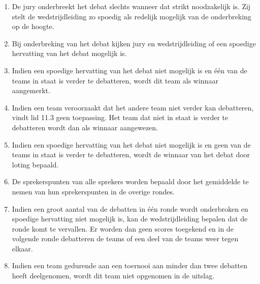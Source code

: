 
\begin{enumerate}
\item De jury onderbreekt het debat slechts wanneer dat strikt noodzakelijk is. Zij stelt de wedstrijdleiding zo spoedig als redelijk mogelijk van de onderbreking op de hoogte.
\item Bij onderbreking van het debat kijken jury en wedstrijdleiding of een spoedige hervatting van het debat mogelijk is.
\item Indien een spoedige hervatting van het debat niet mogelijk is en één van de teams in staat is verder te debatteren, wordt dit team als winnaar aangemerkt.
\item Indien een team veroorzaakt dat het andere team niet verder kan debatteren, vindt lid 11.3 geen toepassing. Het team dat niet in staat is verder te debatteren wordt dan als winnaar aangewezen.
\item Indien een spoedige hervatting van het debat niet mogelijk is en geen van de teams in staat is verder te debatteren, wordt de winnaar van het debat door loting bepaald. 
\item De sprekerspunten van alle sprekers worden bepaald door het gemiddelde te nemen van hun sprekerspunten in de overige rondes.
\item Indien een groot aantal van de debatten in één ronde wordt onderbroken en spoedige hervatting niet mogelijk is, kan de wedstrijdleiding bepalen dat de ronde komt te vervallen. Er worden dan geen scores toegekend en in de volgende ronde debatteren de teams of een deel van de teams weer tegen elkaar.
\item Indien een team gedurende aan een toernooi aan minder dan twee debatten heeft deelgenomen, wordt dit team niet opgenomen in de uitslag.
\end{enumerate}